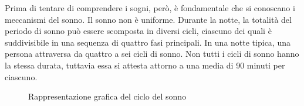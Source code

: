 Prima di tentare di comprendere i sogni, però, è fondamentale che si conoscano i meccanismi del sonno.
Il sonno non è uniforme.
Durante la notte, la totalità del periodo di sonno può essere scomposta in diversi cicli, ciascuno dei quali è
suddivisibile in una sequenza di quattro fasi principali.
In una notte tipica, una persona attraversa da quattro a sei cicli di sonno.
Non tutti i cicli di sonno hanno la stessa durata, tuttavia essa si attesta attorno a una media di 90 minuti per
ciascuno.

\begin{figure}[t]
    \centering
    
    \vspace{-10pt}
    \caption{Rappresentazione grafica del ciclo del sonno}
    \label{fig:sleep-cycle}
\end{figure}

